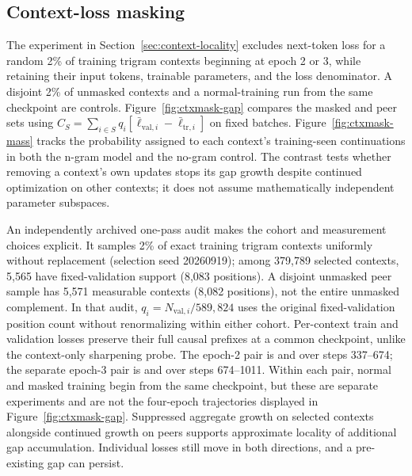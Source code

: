 \subsection{Context-loss masking}

The experiment in Section~\ref{sec:context-locality} excludes next-token loss for a random 2\% of training trigram contexts beginning at epoch 2 or 3, while retaining their input tokens, trainable parameters, and the loss denominator. A disjoint 2\% of unmasked contexts and a normal-training run from the same checkpoint are controls. Figure~\ref{fig:ctxmask-gap} compares the masked and peer sets using $C_S=\sum_{i\in S}q_i[\bar\ell_{\mathrm{val},i}-\bar\ell_{\mathrm{tr},i}]$ on fixed batches. Figure~\ref{fig:ctxmask-mass} tracks the probability assigned to each context's training-seen continuations in both the n-gram model and the no-gram control. The contrast tests whether removing a context's own updates stops its gap growth despite continued optimization on other contexts; it does not assume mathematically independent parameter subspaces.

An independently archived one-pass audit makes the cohort and measurement choices explicit. It samples 2\% of exact training trigram contexts uniformly without replacement (selection seed 20260919); among 379{,}789 selected contexts, 5{,}565 have fixed-validation support (8{,}083 positions). A disjoint unmasked peer sample has 5{,}571 measurable contexts (8{,}082 positions), not the entire unmasked complement. In that audit, $q_i=N_{\mathrm{val},i}/589{,}824$ uses the original fixed-validation position count without renormalizing within either cohort. Per-context train and validation losses preserve their full causal prefixes at a common checkpoint, unlike the context-only sharpening probe. The epoch-2 pair is  and  over steps 337--674; the separate epoch-3 pair is  and  over steps 674--1011. Within each pair, normal and masked training begin from the same checkpoint, but these are separate experiments and are not the four-epoch trajectories displayed in Figure~\ref{fig:ctxmask-gap}. Suppressed aggregate growth on selected contexts alongside continued growth on peers supports approximate locality of additional gap accumulation. Individual losses still move in both directions, and a pre-existing gap can persist.

